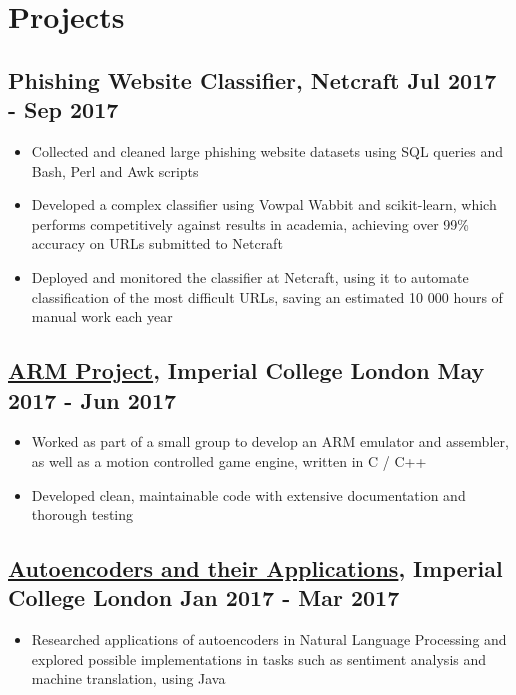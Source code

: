 \documentclass[a4paper, 8pt]{extarticle}
\begin{document}
\begin{minipage}[t]{.65\textwidth}
\section*{Projects}

\subsection*{Phishing Website Classifier, Netcraft \hfill Jul 2017 - Sep 2017}
\begin{itemize}
\item Collected and cleaned large phishing website datasets using SQL queries and Bash, Perl and Awk scripts
\item Developed a complex classifier using Vowpal Wabbit and scikit-learn, which performs competitively against results in academia, achieving over 99\% accuracy on URLs submitted to Netcraft
\item Deployed and monitored the classifier at Netcraft, using it to automate classification of the most difficult URLs, saving an estimated 10 000 hours of manual work each year
\end{itemize}

\subsection*{\href{https://github.com/ic-projects/arm11}{ARM Project}, Imperial College London \hfill May 2017 - Jun 2017}
\begin{itemize}
\item Worked as part of a small group to develop an ARM emulator and assembler, as well as a motion controlled game engine, written in C / C++
\item Developed clean, maintainable code with extensive documentation and thorough testing
\end{itemize}

\subsection*{\href{https://www.doc.ic.ac.uk/~js4416/163/website/}{Autoencoders and their Applications}, Imperial College London \hfill Jan 2017 - Mar 2017}
\begin{itemize}
\item Researched applications of autoencoders in Natural Language Processing and explored possible implementations in tasks such as sentiment analysis and machine translation, using Java
\end{itemize}


\end{minipage}
\end{document}
